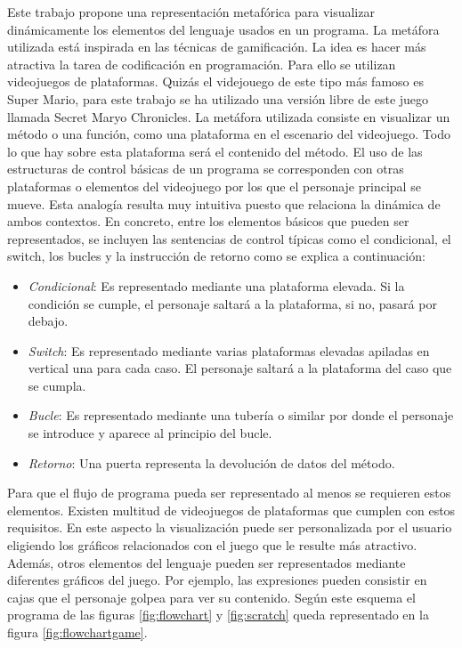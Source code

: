 \documentclass{llncs}
\begin{document}
Este trabajo propone una representación metafórica para visualizar dinámicamente los elementos del lenguaje usados en un programa. La metáfora utilizada está inspirada en las técnicas de gamificación. La idea es hacer más atractiva la tarea de codificación en programación. Para ello se utilizan videojuegos de plataformas. Quizás el videjouego de este tipo más famoso es Super Mario, para este trabajo se ha utilizado una versión libre de este juego llamada Secret Maryo Chronicles. La metáfora utilizada consiste en visualizar un método o una función, como una plataforma en el escenario del videojuego. Todo lo que hay sobre esta plataforma será el contenido del método. El uso de las estructuras de control básicas de un programa se corresponden con otras plataformas o elementos del videojuego por los que el personaje principal se mueve. Esta analogía resulta muy intuitiva puesto que relaciona la dinámica de ambos contextos. En concreto, entre los elementos básicos que pueden ser representados, se incluyen las sentencias de control típicas como el condicional, el switch, los bucles y la instrucción de retorno como se explica a continuación: 

\begin{itemize}
\item {\em Condicional}: Es representado mediante una plataforma elevada. Si la condición se cumple, el personaje saltará a la plataforma, si no, pasará por debajo.
\item {\em Switch}: Es representado mediante varias plataformas elevadas apiladas en vertical una para cada caso. El personaje saltará a la plataforma del caso que se cumpla.
\item {\em Bucle}: Es representado mediante una tubería o similar por donde el personaje se introduce y aparece al principio del bucle.
\item {\em Retorno}: Una puerta representa la devolución de datos del método.
\end{itemize}

Para que el flujo de programa pueda ser representado al menos se requieren estos elementos. Existen multitud de videojuegos de plataformas que cumplen con estos requisitos. En este aspecto la visualización puede ser personalizada por el usuario eligiendo los gráficos relacionados con el juego que le resulte más atractivo. Además, otros elementos del lenguaje pueden ser representados mediante diferentes gráficos del juego. Por ejemplo, las expresiones pueden consistir en cajas que el personaje golpea para ver su contenido. Según este esquema el programa de las figuras \ref{fig:flowchart} y \ref{fig:scratch} queda representado en la figura \ref{fig:flowchartgame}.
\end{document}
